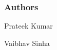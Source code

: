 \subsubsection*{Authors}


\begin{DoxyItemize}
\item Prateek Kumar
\item Vaibhav Sinha 
\end{DoxyItemize}